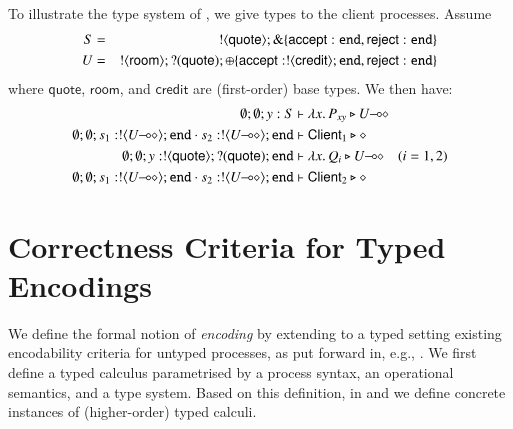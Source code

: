 \documentclass[preprint,11pt]{elsarticle}
\newtheorem{proposition}{Proposition}[section]
\newtheorem{example}{Example}[section]
\newcommand{\rtype}{\mathsf{room}}
\newcommand{\Quote}{\mathsf{quote}}
\newcommand{\accept}{\mathsf{accept}}
\newcommand{\reject}{\mathsf{reject}}
\newcommand{\creditc}{\mathsf{credit}}
\newcommand{\Client}{\mathsf{Client}}
\begin{document}
{ 


To illustrate the type system of \HOp, we give types to the client
processes. %
Assume 
\begin{eqnarray*}
S & = & \btout{\Quote} \btbra{\accept: \tinact, \reject: \tinact} \\
U & = & \btout{\rtype} \btinp{\Quote} \btsel{\accept: \btout{\creditc} \tinact, \reject: \tinact }
\end{eqnarray*}
where $\Quote$, $\rtype$, and $\creditc$ are (first-order) base types.
We then have:
\begin{align*}
\es; \es; y: S & \proves \abs{x}{P_{xy}} \hastype \lhot{U}
\\
	\es; \es; s_1: \btout{\lhot{U}} \tinact \cat s_2: \btout{\lhot{U}} \tinact & \proves \Client_1 \hastype \Proc
\\
	\es; \es; y: \btout{\Quote} \btinp{\Quote} \tinact &\proves \abs{x}{Q_i} \hastype \lhot{U}
 \quad (i=1,2)
 \\
	\es; \es; s_1: \btout{\lhot{U}} \tinact \cat s_2: \btout{\lhot{U}} \tinact & \proves \Client_2 \hastype \Proc
\end{align*}

%

\section{Correctness Criteria for Typed Encodings}
\label{s:expr}
%
We define the formal notion of \emph{encoding} by 
extending to a typed setting existing encodability criteria for untyped processes, as put forward in, e.g.,
\cite{Nestmann00,Palamidessi03,DBLP:conf/lics/PalamidessiSVV06,DBLP:journals/iandc/Gorla10,DBLP:conf/icalp/LanesePSS10,DBLP:journals/tcs/FuL10,DBLP:journals/corr/abs-1208-2750,DBLP:conf/esop/PetersNG13}. 
We first define a typed calculus parametrised by a process syntax, an operational semantics, and a type system.
Based on this definition, in  
 and 
we define concrete instances of (higher-order) typed calculi.
}
\end{document}
